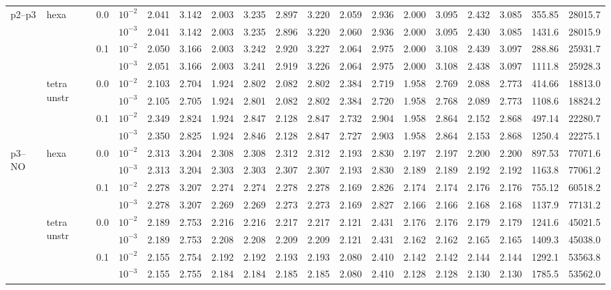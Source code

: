 \begin{longtable}{llclrrrrrrrrrrrrrr}
\multirow{8}{*}{p2--p3} & \multirow{4}{*}{hexa} & \multirow{2}{*}{0.0} & $10^{-2}$ & 2.041 & 3.142 & 2.003 & 3.235 & 2.897 & 3.220 & 2.059 & 2.936 & 2.000 & 3.095 & 2.432 & 3.085 & 355.85 & 28015.7 \\
& & & $10^{-3}$ & 2.041 & 3.142 & 2.003 & 3.235 & 2.896 & 3.220 & 2.060 & 2.936 & 2.000 & 3.095 & 2.430 & 3.085 & 1431.6 & 28015.9 \\\cline{3-18}
& & \multirow{2}{*}{0.1} & $10^{-2}$ & 2.050 & 3.166 & 2.003 & 3.242 & 2.920 & 3.227 & 2.064 & 2.975 & 2.000 & 3.108 & 2.439 & 3.097 & 288.86 & 25931.7 \\
& & & $10^{-3}$ & 2.051 & 3.166 & 2.003 & 3.241 & 2.919 & 3.226 & 2.064 & 2.975 & 2.000 & 3.108 & 2.438 & 3.097 & 1111.8 & 25928.3 \\\cline{2-18}
& \multirow{4}{*}{tetra unstr} & \multirow{2}{*}{0.0} & $10^{-2}$ & 2.103 & 2.704 & 1.924 & 2.802 & 2.082 & 2.802 & 2.384 & 2.719 & 1.958 & 2.769 & 2.088 & 2.773 & 414.66 & 18813.0 \\
& & & $10^{-3}$ & 2.105 & 2.705 & 1.924 & 2.801 & 2.082 & 2.802 & 2.384 & 2.720 & 1.958 & 2.768 & 2.089 & 2.773 & 1108.6 & 18824.2 \\\cline{3-18}
& & \multirow{2}{*}{0.1} & $10^{-2}$ & 2.349 & 2.824 & 1.924 & 2.847 & 2.128 & 2.847 & 2.732 & 2.904 & 1.958 & 2.864 & 2.152 & 2.868 & 497.14 & 22280.7 \\
& & & $10^{-3}$ & 2.350 & 2.825 & 1.924 & 2.846 & 2.128 & 2.847 & 2.727 & 2.903 & 1.958 & 2.864 & 2.153 & 2.868 & 1250.4 & 22275.1 \\\hline

\multirow{8}{*}{p3--NO} & \multirow{4}{*}{hexa} & \multirow{2}{*}{0.0} & $10^{-2}$ & 2.313 & 3.204 & 2.308 & 2.308 & 2.312 & 2.312 & 2.193 & 2.830 & 2.197 & 2.197 & 2.200 & 2.200 & 897.53 & 77071.6 \\
& & & $10^{-3}$ & 2.313 & 3.204 & 2.303 & 2.303 & 2.307 & 2.307 & 2.193 & 2.830 & 2.189 & 2.189 & 2.192 & 2.192 & 1163.8 & 77061.2 \\\cline{3-18}
& & \multirow{2}{*}{0.1} & $10^{-2}$ & 2.278 & 3.207 & 2.274 & 2.274 & 2.278 & 2.278 & 2.169 & 2.826 & 2.174 & 2.174 & 2.176 & 2.176 & 755.12 & 60518.2 \\
& & & $10^{-3}$ & 2.278 & 3.207 & 2.269 & 2.269 & 2.273 & 2.273 & 2.169 & 2.827 & 2.166 & 2.166 & 2.168 & 2.168 & 1137.9 & 77131.2 \\\cline{2-18}
& \multirow{4}{*}{tetra unstr} & \multirow{2}{*}{0.0} & $10^{-2}$ & 2.189 & 2.753 & 2.216 & 2.216 & 2.217 & 2.217 & 2.121 & 2.431 & 2.176 & 2.176 & 2.179 & 2.179 & 1241.6 & 45021.5 \\
& & & $10^{-3}$ & 2.189 & 2.753 & 2.208 & 2.208 & 2.209 & 2.209 & 2.121 & 2.431 & 2.162 & 2.162 & 2.165 & 2.165 & 1409.3 & 45038.0 \\\cline{3-18}
& & \multirow{2}{*}{0.1} & $10^{-2}$ & 2.155 & 2.754 & 2.192 & 2.192 & 2.193 & 2.193 & 2.080 & 2.410 & 2.142 & 2.142 & 2.144 & 2.144 & 1292.1 & 53563.8 \\
& & & $10^{-3}$ & 2.155 & 2.755 & 2.184 & 2.184 & 2.185 & 2.185 & 2.080 & 2.410 & 2.128 & 2.128 & 2.130 & 2.130 & 1785.5 & 53562.0 \\\hline


\end{longtable}
